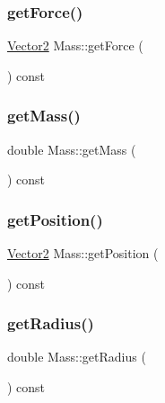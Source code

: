 \subsubsection{\texorpdfstring{get\+Force()}{getForce()}}
{\footnotesize\ttfamily \hyperlink{classVector2}{Vector2} Mass\+::get\+Force (\begin{DoxyParamCaption}{ }\end{DoxyParamCaption}) const}

\mbox{\label{classMass_a99e1ec35c6095c90a4b631228f04900f}} 
\subsubsection{\texorpdfstring{get\+Mass()}{getMass()}}
{\footnotesize\ttfamily double Mass\+::get\+Mass (\begin{DoxyParamCaption}{ }\end{DoxyParamCaption}) const}

\mbox{\label{classMass_a7b244f213544f309b07970e4883089dc}} 
\subsubsection{\texorpdfstring{get\+Position()}{getPosition()}}
{\footnotesize\ttfamily \hyperlink{classVector2}{Vector2} Mass\+::get\+Position (\begin{DoxyParamCaption}{ }\end{DoxyParamCaption}) const}

\mbox{\label{classMass_a9ec88fcb850a603f9f9085cfe09796ee}} 
\subsubsection{\texorpdfstring{get\+Radius()}{getRadius()}}
{\footnotesize\ttfamily double Mass\+::get\+Radius (\begin{DoxyParamCaption}{ }\end{DoxyParamCaption}) const}

\mbox{\label{classMass_adba409e1c341b4709a2545a354b8c91d}} 
